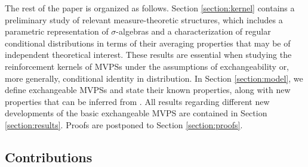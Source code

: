 \documentclass[a4paper]{article}
\theoremstyle{plain}
\theoremstyle{remark}
\theoremstyle{definition}
\begin{document}
The rest of the paper is organized as follows. Section \ref{section:kernel} contains a preliminary study of relevant measure-theoretic structures, which includes a parametric representation of $\sigma$-algebras and a characterization of regular conditional distributions in terms of their averaging properties that may be of independent theoretical interest. These results are essential when studying the reinforcement kernels of MVPSs under the assumptions of exchangeability or, more generally, conditional identity in distribution. In Section \ref{section:model}, we define exchangeable MVPSs and state their known properties, along with new properties that can be inferred from \cite{berti2023kernel,sariev2024}. All results regarding different new developments of the basic exchangeable MVPS are contained in Section \ref{section:results}. Proofs are postponed to Section \ref{section:proofs}.

\subsection{Contributions}
\end{document}
